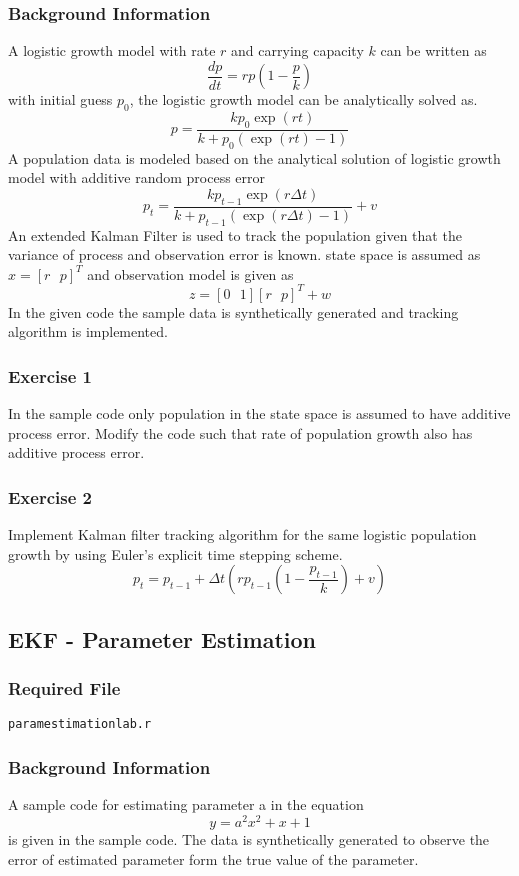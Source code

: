 \documentclass{article}
\newcommand{\code}[1]{\texttt{#1}}
\begin{document}
\subsubsection*{Background Information}
A logistic growth model with rate $r$ and carrying capacity $k$ can be written as
$$\frac{dp}{dt}=rp\left( 1-\frac{p}{k}\right)$$
with initial guess $p_0$, the logistic growth model can be analytically solved as.
$$p=\frac{kp_0\exp(rt)}{k+p_0(\exp(rt)-1)}$$
A population data is modeled based on the analytical solution of logistic growth model with additive random process error
$$p_{t}=\frac{kp_{t-1}\exp(r \Delta t)}{k+p_{t-1}(\exp(r \Delta t)-1)} + v$$
An extended Kalman Filter is used to track the population given that the variance of process and observation error is known. state space is assumed as $x=[r \text{  }  p]^T$ and observation model is given as
$$z=[0\text{  }  1][r\text{  }  p]^T+w$$
In the given code the sample data is  synthetically generated and tracking algorithm is implemented.

\subsubsection*{Exercise 1}
In the sample code only population in the state space is assumed to have additive process error. Modify the code such that rate of population growth also has additive process error. 
\subsubsection*{Exercise 2}
Implement Kalman filter tracking algorithm for the same logistic population growth by using Euler's explicit time stepping scheme.
$$p_t=p_{t-1}+\Delta t \left( rp_{t-1}\left( 1-\frac{p_{t-1}}{k}\right)+ v\right )$$

\subsection{EKF - Parameter Estimation}
\subsubsection*{Required File}
\code{paramestimationlab.r}
\subsubsection*{Background Information}
A sample code for estimating parameter a in the equation $$y=a^2x^2+x+1$$ is given in the sample code.  The data is synthetically generated to observe the error of estimated parameter form the true value of the parameter.
\end{document}
